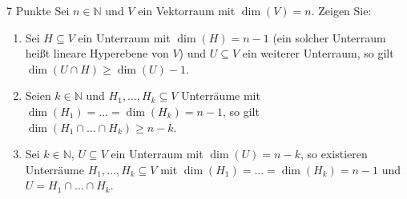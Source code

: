 \documentclass{../problemset}
\begin{document}
\begin{problem}{7 Punkte}
Sei $n \in \mathbb{N}$ und $V$ ein Vektorraum mit $\dim(V) = n$. Zeigen Sie:
\begin{enumerate}
	\item Sei $H \subseteq V$ ein Unterraum mit $\dim(H) = n - 1$ (ein solcher Unterraum heißt lineare Hyperebene von $V$) und $U \subseteq V$ ein weiterer Unterraum, so gilt $\dim(U \cap H) \geq \dim(U) - 1$.
	\item Seien $k \in \mathbb{N}$ und $H_1, \ldots, H_k \subseteq V$ Unterräume mit $\dim(H_1) = \ldots = \dim(H_k) = n - 1$, so gilt $\dim(H_1 \cap \ldots \cap H_k) \geq n - k$.
	\item Sei $k \in \mathbb{N}$, $U \subseteq V$ ein Unterraum mit $\dim(U) = n - k$, so existieren Unterräume $H_1, \ldots, H_k \subseteq V$ mit $\dim(H_1) = \ldots = \dim(H_k) = n - 1$ und $U = H_1 \cap \ldots \cap H_k$.
\end{enumerate}
\end{problem}
\end{document}
